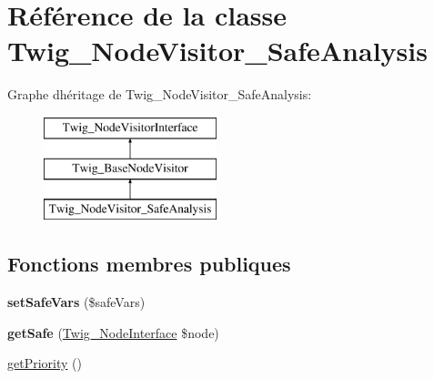 \hypertarget{class_twig___node_visitor___safe_analysis}{}\section{Référence de la classe Twig\+\_\+\+Node\+Visitor\+\_\+\+Safe\+Analysis}
\label{class_twig___node_visitor___safe_analysis}
Graphe d\textquotesingle{}héritage de Twig\+\_\+\+Node\+Visitor\+\_\+\+Safe\+Analysis\+:\begin{figure}[H]
\begin{center}
\leavevmode
\includegraphics[height=3.000000cm]{class_twig___node_visitor___safe_analysis}
\end{center}
\end{figure}
\subsection*{Fonctions membres publiques}
\begin{DoxyCompactItemize}
\item 
{\bfseries set\+Safe\+Vars} (\$safe\+Vars)\hypertarget{class_twig___node_visitor___safe_analysis_ae2afa581f7816a7d16dcc74f004767fc}{}\label{class_twig___node_visitor___safe_analysis_ae2afa581f7816a7d16dcc74f004767fc}

\item 
{\bfseries get\+Safe} (\hyperlink{interface_twig___node_interface}{Twig\+\_\+\+Node\+Interface} \$node)\hypertarget{class_twig___node_visitor___safe_analysis_acc3b73509017790429de059f337b7a8c}{}\label{class_twig___node_visitor___safe_analysis_acc3b73509017790429de059f337b7a8c}

\item 
\hyperlink{class_twig___node_visitor___safe_analysis_a1e7a3c168dcd0901a0d2669c67575b55}{get\+Priority} ()
\end{DoxyCompactItemize}
